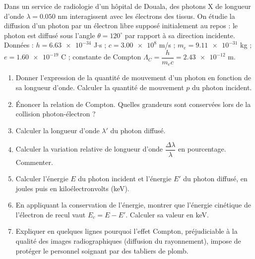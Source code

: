 \documentclass[11pt]{article}
\providecommand{\degree}{^{\circ}}
\begin{document}
\begin{exercice}
Dans un service de radiologie d'un hôpital de Douala, des photons X de longueur d'onde $\lambda = \num{0,050}$ nm interagissent avec les électrons des tissus. On étudie la diffusion d'un photon par un électron libre supposé initialement au repos : le photon est diffusé sous l'angle $\theta = 120\degree$ par rapport à sa direction incidente.
Données : $h = \num{6,63e-34}$ J$\cdot$s ; $c = \num{3,00e8}$ m/s ; $m_e = \num{9,11e-31}$ kg ; $e = \num{1,60e-19}$ C ; constante de Compton $\Lambda_C = \dfrac{h}{m_e c} = \num{2,43e-12}$ m.
\begin{enumerate}
\item Donner l'expression de la quantité de mouvement d'un photon en fonction de sa longueur d'onde. Calculer la quantité de mouvement $p$ du photon incident.
\item Énoncer la relation de Compton. Quelles grandeurs sont conservées lors de la collision photon-électron ?
\item Calculer la longueur d'onde $\lambda'$ du photon diffusé.
\item Calculer la variation relative de longueur d'onde $\dfrac{\Delta\lambda}{\lambda}$ en pourcentage. Commenter.
\item Calculer l'énergie $E$ du photon incident et l'énergie $E'$ du photon diffusé, en joules puis en kiloélectronvolts (keV).
\item En appliquant la conservation de l'énergie, montrer que l'énergie cinétique de l'électron de recul vaut $E_c = E - E'$. Calculer sa valeur en keV.
\item Expliquer en quelques lignes pourquoi l'effet Compton, préjudiciable à la qualité des images radiographiques (diffusion du rayonnement), impose de protéger le personnel soignant par des tabliers de plomb.
\end{enumerate}
\end{exercice}
\end{document}
